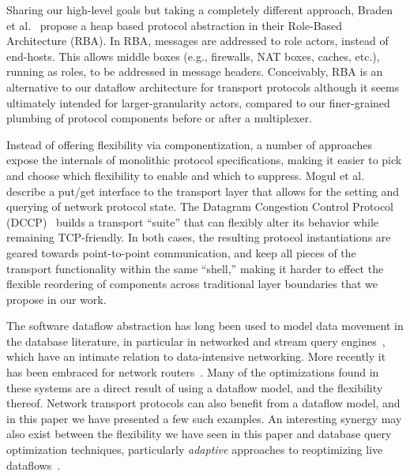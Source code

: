 Sharing our high-level goals but taking a completely different approach,
Braden et al.~\cite{rba} propose a heap based protocol abstraction in
their Role-Based Architecture (RBA). 
In RBA, messages are addressed to role actors, instead of end-hosts. This allows 
middle boxes (e.g., firewalls, NAT boxes, caches, etc.), running as roles, to be addressed 
in message headers. Conceivably, RBA is an alternative to our dataflow
architecture for transport protocols although it seems ultimately
intended for larger-granularity actors, compared to our finer-grained
plumbing of protocol components before or after a multiplexer.
% 
% 

Instead of offering flexibility via componentization, a number of
approaches expose the internals of monolithic protocol specifications,
making it easier to pick and choose which flexibility to enable and
which to suppress. 
Mogul et al.~\cite{unveiling} describe a put/get interface to the transport layer that allows for the setting
and querying of network protocol state.
The Datagram Congestion Control Protocol (DCCP)~\cite{dccp} builds a
transport ``suite'' that can flexibly alter its behavior
while remaining TCP-friendly. In both cases, the resulting protocol
instantiations are geared towards point-to-point communication, and
keep all pieces of the transport functionality within the same
``shell,'' making it harder to effect the flexible reordering of
components across traditional layer boundaries that we
propose in our work.

The software dataflow abstraction has long been used to model data
movement in the database literature, in particular in
networked and stream query engines~\cite{telegraphcq,aurora}, which
have an intimate relation to data-intensive networking.  More recently
it has been embraced for network
routers~\cite{click-tocs,handley05xorp}.  Many of the 
optimizations found in these systems are a direct result of using a
dataflow model, and the flexibility thereof.  Network
transport protocols can also benefit from a dataflow model, and in
this paper we have presented a few such examples.  An interesting
synergy may also exist between the flexibility we have seen in this paper
and database query optimization techniques, particularly {\em
  adaptive} approaches to reoptimizing live
dataflows~\cite{telegraphcq,babu-cidr05}.


